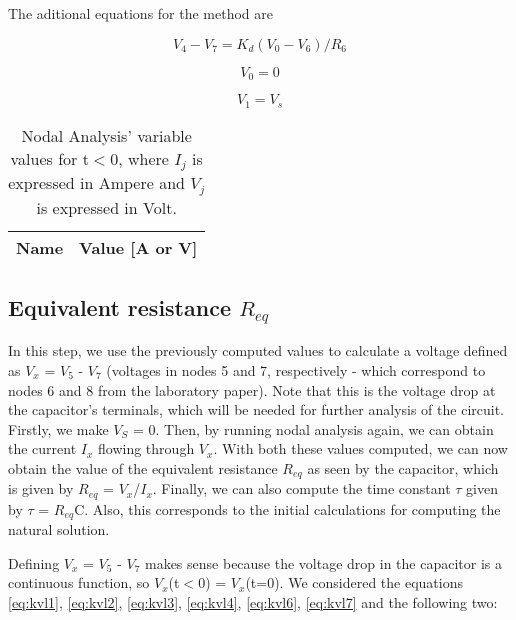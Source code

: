 The aditional equations for the method are

\begin{equation}
  V_4 - V_7 = K_d(V_0 - V_6)/R_6
  \label{eq:kvl6}
\end{equation}

\begin{equation}
  V_0 = 0
  \label{eq:kvl7}
\end{equation}

\begin{equation}
  V_1 = V_s
  \label{eq:kvl8}
\end{equation}


\begin{table}[h]
  \centering
  \begin{tabular}{|l|r|}
    \hline    
    {\bf Name} & {\bf Value [A or V]} \\ \hline
    
  \end{tabular}
  \caption{Nodal Analysis' variable values for t$<$0, where $I_j$ is expressed in Ampere and $V_j$ is expressed in Volt.}
  \label{tab:Nodal}
\end{table}
\FloatBarrier

\subsection{Equivalent resistance $R_{eq}$}
\label{sec:2.2}

In this step, we use the previously computed values to calculate a voltage defined as $V_x$ = $V_5$ - $V_7$ (voltages in nodes 5 and 7, respectively - which correspond to nodes 6 and 8 from the laboratory paper). Note that this is the voltage drop at the capacitor's terminals, which will be needed for further analysis of the circuit. Firstly, we make $V_S$ = 0. Then, by running nodal analysis again, we can obtain the current $I_x$ flowing through $V_x$. With both these values computed, we can now obtain the value of the equivalent resistance $R_{eq}$ as seen by the capacitor, which is given by $R_{eq}$ = $V_x$/$I_x$. Finally, we can also compute the time constant $\tau$ given by $\tau$ = $R_{eq}$C. Also, this corresponds to the initial calculations for computing the natural solution. \par
Defining $V_x$ = $V_5$ - $V_7$ makes sense because the voltage drop in the capacitor is a continuous function, so $V_x$(t$<$0) = $V_x$(t=0).
We considered the equations \ref{eq:kvl1}, \ref{eq:kvl2}, \ref{eq:kvl3}, \ref{eq:kvl4}, \ref{eq:kvl6}, \ref{eq:kvl7} and the following two:

